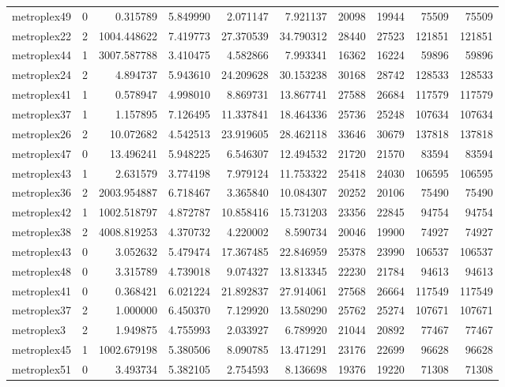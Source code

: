 \begin{longtable}{|l|r|r|r|r|r|r|r|r|r|}
metroplex49 & 0 & 0.315789 & 5.849990 & 2.071147 & 7.921137 & 20098 & 19944 & 75509 & 75509 \\
metroplex22 & 2 & 1004.448622 & 7.419773 & 27.370539 & 34.790312 & 28440 & 27523 & 121851 & 121851 \\
metroplex44 & 1 & 3007.587788 & 3.410475 & 4.582866 & 7.993341 & 16362 & 16224 & 59896 & 59896 \\
metroplex24 & 2 & 4.894737 & 5.943610 & 24.209628 & 30.153238 & 30168 & 28742 & 128533 & 128533 \\
metroplex41 & 1 & 0.578947 & 4.998010 & 8.869731 & 13.867741 & 27588 & 26684 & 117579 & 117579 \\
metroplex37 & 1 & 1.157895 & 7.126495 & 11.337841 & 18.464336 & 25736 & 25248 & 107634 & 107634 \\
metroplex26 & 2 & 10.072682 & 4.542513 & 23.919605 & 28.462118 & 33646 & 30679 & 137818 & 137818 \\
metroplex47 & 0 & 13.496241 & 5.948225 & 6.546307 & 12.494532 & 21720 & 21570 & 83594 & 83594 \\
metroplex43 & 1 & 2.631579 & 3.774198 & 7.979124 & 11.753322 & 25418 & 24030 & 106595 & 106595 \\
metroplex36 & 2 & 2003.954887 & 6.718467 & 3.365840 & 10.084307 & 20252 & 20106 & 75490 & 75490 \\
metroplex42 & 1 & 1002.518797 & 4.872787 & 10.858416 & 15.731203 & 23356 & 22845 & 94754 & 94754 \\
metroplex38 & 2 & 4008.819253 & 4.370732 & 4.220002 & 8.590734 & 20046 & 19900 & 74927 & 74927 \\
metroplex43 & 0 & 3.052632 & 5.479474 & 17.367485 & 22.846959 & 25378 & 23990 & 106537 & 106537 \\
metroplex48 & 0 & 3.315789 & 4.739018 & 9.074327 & 13.813345 & 22230 & 21784 & 94613 & 94613 \\
metroplex41 & 0 & 0.368421 & 6.021224 & 21.892837 & 27.914061 & 27568 & 26664 & 117549 & 117549 \\
metroplex37 & 2 & 1.000000 & 6.450370 & 7.129920 & 13.580290 & 25762 & 25274 & 107671 & 107671 \\
metroplex3 & 2 & 1.949875 & 4.755993 & 2.033927 & 6.789920 & 21044 & 20892 & 77467 & 77467 \\
metroplex45 & 1 & 1002.679198 & 5.380506 & 8.090785 & 13.471291 & 23176 & 22699 & 96628 & 96628 \\
metroplex51 & 0 & 3.493734 & 5.382105 & 2.754593 & 8.136698 & 19376 & 19220 & 71308 & 71308 \\

\end{longtable}
